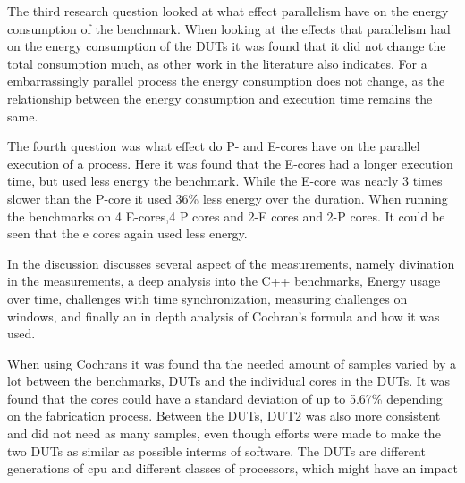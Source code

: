 The third research question looked at what effect parallelism have on the energy consumption of the benchmark. When looking at the effects that parallelism had on the energy consumption of the DUTs it was found that it did not change the total consumption much, as other work in the literature also indicates. For a embarrassingly parallel process the energy consumption does not change, as the relationship between the energy consumption and execution time remains the same. 

The fourth question was what effect do P- and E-cores have on the parallel execution of a process. Here it was found that the E-cores had a longer execution time, but used less energy the benchmark. While the E-core was nearly 3 times slower than the P-core it used 36\% less energy over the duration. When running the benchmarks on 4 E-cores,4 P cores and 2-E cores and 2-P cores. It could be seen that the e cores again used less energy.

In the discussion discusses several aspect of the measurements, namely divination in the measurements, a deep analysis into the C++ benchmarks, Energy usage over time, challenges with time synchronization, measuring challenges on windows, and finally an in depth analysis of Cochran's formula and how it was used. 

When using Cochrans it was found tha the needed amount of samples varied by a lot between the benchmarks, DUTs and the individual cores in the DUTs. It was found that the cores could have a standard deviation of up to 5.67\% depending on the fabrication process. Between the DUTs, DUT2 was also more consistent and did not need as many samples, even though efforts were made to make the two DUTs as similar as possible interms of software. The DUTs are different generations of cpu and different classes of processors, which might have an impact




